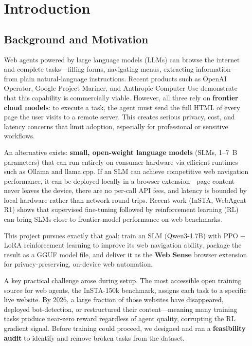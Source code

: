\documentclass[12pt,a4paper]{report}
\begin{document}
\clearpage
{}

\chapter{Introduction}

\section{Background and Motivation}

Web agents powered by large language models (LLMs) can browse the internet and complete tasks---filling forms, navigating menus, extracting information---from plain natural-language instructions. Recent products such as OpenAI Operator, Google Project Mariner, and Anthropic Computer Use demonstrate that this capability is commercially viable. However, all three rely on \textbf{frontier cloud models}: to execute a task, the agent must send the full HTML of every page the user visits to a remote server. This creates serious privacy, cost, and latency concerns that limit adoption, especially for professional or sensitive workflows.

An alternative exists: \textbf{small, open-weight language models} (SLMs, 1--7~B parameters) that can run entirely on consumer hardware via efficient runtimes such as Ollama and llama.cpp. If an SLM can achieve competitive web navigation performance, it can be deployed locally in a browser extension---page content never leaves the device, there are no per-call API fees, and latency is bounded by local hardware rather than network round-trips. Recent work (InSTA, WebAgent-R1) shows that supervised fine-tuning followed by reinforcement learning (RL) can bring SLMs close to frontier-model performance on web benchmarks.

This project pursues exactly that goal: train an SLM (Qwen3-1.7B) with PPO + LoRA reinforcement learning to improve its web navigation ability, package the result as a GGUF model file, and deliver it as the \textbf{Web Sense} browser extension for privacy-preserving, on-device web automation.

A key practical challenge arose during setup. The most accessible open training source for web agents, the InSTA-150k benchmark, assigns each task to a specific live website. By 2026, a large fraction of those websites have disappeared, deployed bot-detection, or restructured their content---meaning many training tasks produce near-zero reward regardless of agent quality, corrupting the RL gradient signal. Before training could proceed, we designed and ran a \textbf{feasibility audit} to identify and remove broken tasks from the dataset.
\end{document}

